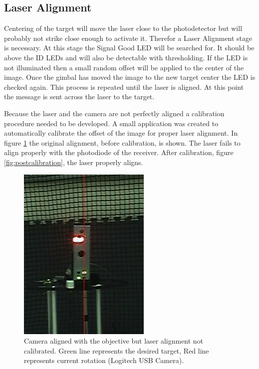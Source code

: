 \documentclass[botnum, fleqn]{unmeethesis}
\begin{document}
\subsection*{Laser Alignment}
Centering of the target will move the laser close to the photodetector but will probably not strike close enough to activate it. Therefor a Laser Alignment stage is necessary. At this stage the Signal Good LED will be searched for. It should be above the ID LEDs and will also be detectable with thresholding. If the LED is not illuminated then a small random offset will be applied to the center of the image. Once the gimbal has moved the image to the new target center the LED is checked again. This process is repeated until the laser is aligned.  At this point the message is sent across the laser to the target.

Because the laser and the camera are not perfectly aligned a calibration procedure needed to be developed. A small application was created to automatically calibrate the offset of the image for proper laser alignment. In figure \ref{fig:precalibration} the original alignment, before calibration, is shown. The laser fails to align properly with the photodiode of the receiver. After calibration, figure \ref{fig:postcalibration}, the laser properly aligns. 

\begin{figure}[ht]
 \begin{center}
  \includegraphics[width=0.5 \textwidth]{figures/precalibration.png}
  \caption{\small \label{fig:precalibration} Camera aligned with the objective but laser alignment not calibrated. Green line represents the desired target, Red line represents current rotation (Logitech USB Camera).}
 \end{center}
\end{figure}
\end{document}
